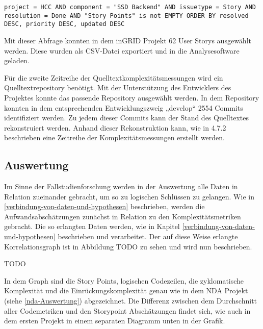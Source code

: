 \lstset{language=SQL}
\begin{lstlisting}
project = HCC AND component = "SSD Backend" AND issuetype = Story AND resolution = Done AND "Story Points" is not EMPTY ORDER BY resolved DESC, priority DESC, updated DESC
\end{lstlisting}

Mit dieser Abfrage konnten in dem inGRID Projekt 62 User Storys
ausgewählt werden. Diese wurden als CSV-Datei exportiert und in die
Analysesoftware geladen.

Für die zweite Zeitreihe der Quelltextkomplexitätsmessungen wird ein
Quelltextrepository benötigt. Mit der Unterstützung des Entwicklers des
Projektes konnte das passende Repository ausgewählt werden. In dem
Repository konnten in dem entsprechenden Entwicklungszweig „develop``
2554 Commits identifiziert werden. Zu jedem dieser Commits kann der
Stand des Quelltextes rekonstruiert werden. Anhand dieser Rekonstruktion
kann, wie in 4.7.2 beschrieben eine Zeitreihe der Komplexitätsmessungen
erstellt werden.

\subsection{Auswertung}\label{ingrid-Auswertung}

Im Sinne der Fallstudienforschung werden in der Auswertung alle Daten in
Relation zueinander gebracht, um so zu logischen Schlüssen zu gelangen.
Wie in \ref{verbindung-von-daten-und-hypothesen} beschrieben, werden die Aufwandsabschätzungen zunächst in
Relation zu den Komplexitätsmetriken gebracht. Die so erlangten Daten
werden, wie in Kapitel \ref{verbindung-von-daten-und-hypothesen} beschrieben und verarbeitet. Der auf diese Weise
erlangte Korrelationsgraph ist in Abbildung TODO zu sehen und wird nun
beschrieben.

TODO

In dem Graph sind die Story Points, logischen Codezeilen, die
zyklomatische Komplexität und die Einrückungskomplexität genau wie in
dem NDA Projekt (siehe \ref{nda-Auswertung}) abgezeichnet. Die Differenz zwischen dem
Durchschnitt aller Codemetriken und den Storypoint Abschätzungen findet
sich, wie auch in dem ersten Projekt in einem separaten Diagramm unten
in der Grafik.

